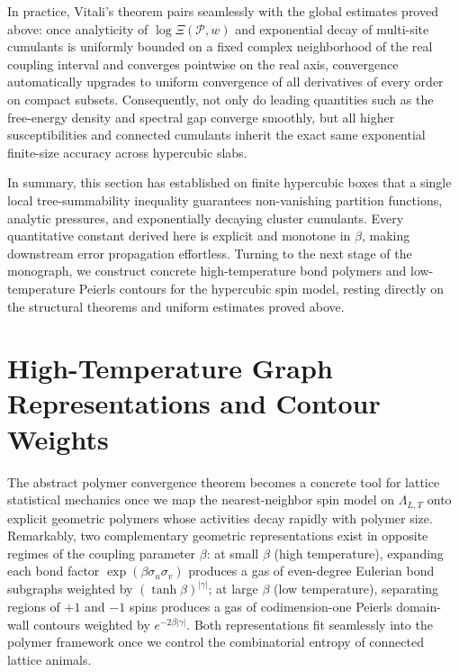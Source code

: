 \documentclass[11pt]{article}
\theoremstyle{definition}
\begin{document}
In practice, Vitali's theorem pairs seamlessly with the global estimates proved
above: once analyticity of $\log \Xi(\mathcal{P}, w)$ and exponential decay of
multi-site cumulants is uniformly bounded on a fixed complex neighborhood of the
real coupling interval and converges pointwise on the real axis, convergence
automatically upgrades to uniform convergence of all derivatives of every order on
compact subsets. Consequently, not only do leading quantities such as the
free-energy density and spectral gap converge smoothly, but all higher
susceptibilities and connected cumulants inherit the exact same exponential
finite-size accuracy across hypercubic slabs.

In summary, this section has established on finite hypercubic boxes that a single
local tree-summability inequality guarantees non-vanishing partition functions,
analytic pressures, and exponentially decaying cluster cumulants. Every quantitative
constant derived here is explicit and monotone in $\beta$, making downstream error
propagation effortless. Turning to the next stage of the monograph, we construct
concrete high-temperature bond polymers and low-temperature Peierls contours for the
hypercubic spin model, resting directly on the structural theorems and uniform
estimates proved above.

\section{High-Temperature Graph Representations and Contour Weights}
\label{sec:s04}

The abstract polymer convergence theorem becomes a concrete tool for lattice
statistical mechanics once we map the nearest-neighbor spin model on $\Lambda_{L,T}$
onto explicit geometric polymers whose activities decay rapidly with polymer size.
Remarkably, two complementary geometric representations exist in opposite regimes of
the coupling parameter $\beta$: at small $\beta$ (high temperature), expanding each
bond factor $\exp(\beta \sigma_u \sigma_v)$ produces a gas of even-degree Eulerian
bond subgraphs weighted by $(\tanh \beta)^{|\gamma|}$; at large $\beta$ (low
temperature), separating regions of $+1$ and $-1$ spins produces a gas of
codimension-one Peierls domain-wall contours weighted by $e^{-2\beta |\gamma|}$.
Both representations fit seamlessly into the polymer framework once we control the
combinatorial entropy of connected lattice animals.
\end{document}
